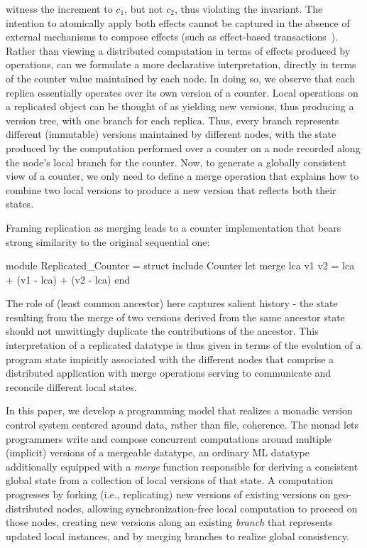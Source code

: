 witness the increment to $c_1$, but not $c_2$, thus violating the
invariant. The intention to atomically apply both effects cannot be
captured in the absence of external mechanisms to compose effects
(such as effect-based transactions~\cite{pldi15}).  Rather than
viewing a distributed computation in terms of  effects produced
by operations, can we formulate a more declarative interpretation,
directly in terms of the counter value maintained by each node.  In
doing so, we observe that each replica essentially operates over its
own version of a counter.  Local operations on a replicated object can
be thought of as yielding new versions, thus producing a version tree,
with one branch for each replica.  Thus, every branch represents
different (immutable) versions maintained by different nodes, with the
state produced by the computation performed over a counter on a node
recorded along the node's local branch for the counter.  Now, to
generate a globally consistent view of a counter, we only need to
define a merge operation that explains how to combine two local
versions to produce a new version that reflects both their states.

Framing replication as merging leads to a counter implementation that
bears strong similarity to the original sequential one:
  \begin{ocaml}
    module Replicated_Counter = struct
      include Counter
      let merge lca v1 v2 =
         lca + (v1 - lca) + (v2 - lca)
    end
  \end{ocaml}
The role of  (least common ancestor) here captures salient
history - the state resulting from the merge of two versions derived
from the same ancestor state should not unwittingly duplicate the
contributions of the ancestor.  This interpretation of a replicated
datatype is thus given in terms of the evolution of a program state
impicitly associated with the different nodes that comprise a
distributed application with merge operations serving to communicate
and reconcile different local states.

In this paper, we develop a programming model that realizes a monadic
version control system centered around data, rather than file,
coherence.  The \name monad lets programmers write and compose
concurrent computations around multiple (implicit) versions of a
mergeable datatype, an ordinary ML datatype additionally equipped with
a \emph{merge} function responsible for deriving a consistent global
state from a collection of local versions of that state.  A
computation progresses by forking (i.e., replicating) new versions of
existing versions on geo-distributed nodes, allowing
synchronization-free local computation to proceed on those nodes,
creating new versions along an existing \emph{branch} that represents
updated local instances, and by merging branches to realize global
consistency.

